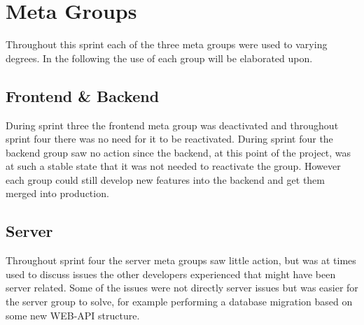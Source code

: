 \section{Meta Groups}
Throughout this sprint each of the three meta groups were used to varying degrees. 
In the following the use of each group will be elaborated upon. 
 
\subsection{Frontend \& Backend}
During sprint three the frontend meta group was deactivated and throughout sprint four there was no need for it to be reactivated. 
During sprint four the backend group saw no action since the backend, at this point of the project, was at such a stable state that it was not needed to reactivate the group.
However each group could still develop new features into the backend and get them merged into production. 

\subsection{Server}
Throughout sprint four the server meta groups saw little action, but was at times used to discuss issues the other developers experienced that might have been server related. 
Some of the issues were not directly server issues but was easier for the server group to solve, for example performing a database migration based on some new WEB-API structure.



